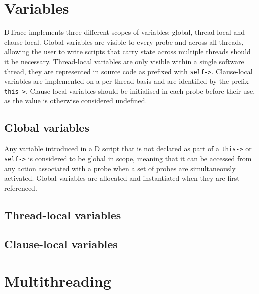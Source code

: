 
\section{Variables}
\label{sec:d-variables}
DTrace implements three different scopes of variables: global,
thread-local and clause-local. Global variables are visible to every
probe and across all threads, allowing the user to write scripts that
carry state across multiple threads should it be
necessary. Thread-local variables are only visible within a single
software thread, they are represented in source code as prefixed with
\texttt{self->}. Clause-local variables are implemented on a
per-thread basis and are identified by the prefix
\texttt{this->}. Clause-local variables should be initialised in each
probe before their use, as the value is otherwise considered
undefined.

\subsection{Global variables}
\label{subsec:global-variables}

Any variable introduced in a D script that is not declared as part of
a \verb|this->| or \verb|self->| is considered to be global in scope,
meaning that it can be accessed from any action associated with a
probe when a set of probes are simultaneously activated.  Global
variables are allocated and instantiated when they are first
referenced.

\subsection{Thread-local variables}
\label{subsec:thread-local-variables}

\subsection{Clause-local variables}
\label{subsec:clause-local-variables}

\section{Multithreading}


